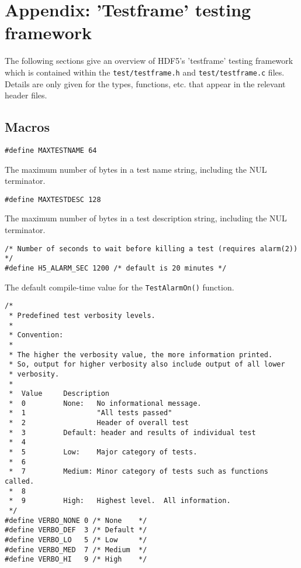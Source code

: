 \documentclass[../HDF5_RFC.tex]{subfiles}
\begin{document}
\newpage

\section{Appendix: 'Testframe' testing framework}
\label{apdx:test_frame}

The following sections give an overview of HDF5's 'testframe' testing framework which is contained
within the \texttt{test/testframe.h} and \texttt{test/testframe.c} files. Details are only given
for the types, functions, etc. that appear in the relevant header files.

\subsection{Macros}

\begin{verbatim}
#define MAXTESTNAME 64
\end{verbatim}

The maximum number of bytes in a test name string, including the NUL terminator.

\begin{verbatim}
#define MAXTESTDESC 128
\end{verbatim}

The maximum number of bytes in a test description string, including the NUL terminator.

\begin{verbatim}
/* Number of seconds to wait before killing a test (requires alarm(2)) */
#define H5_ALARM_SEC 1200 /* default is 20 minutes */
\end{verbatim}

The default compile-time value for the \texttt{TestAlarmOn()} function.

\begin{verbatim}
/*
 * Predefined test verbosity levels.
 *
 * Convention:
 *
 * The higher the verbosity value, the more information printed.
 * So, output for higher verbosity also include output of all lower
 * verbosity.
 *
 *  Value     Description
 *  0         None:   No informational message.
 *  1                 "All tests passed"
 *  2                 Header of overall test
 *  3         Default: header and results of individual test
 *  4
 *  5         Low:    Major category of tests.
 *  6
 *  7         Medium: Minor category of tests such as functions called.
 *  8
 *  9         High:   Highest level.  All information.
 */
#define VERBO_NONE 0 /* None    */
#define VERBO_DEF  3 /* Default */
#define VERBO_LO   5 /* Low     */
#define VERBO_MED  7 /* Medium  */
#define VERBO_HI   9 /* High    */
\end{verbatim}
\end{document}
